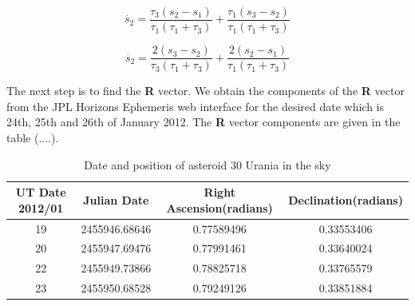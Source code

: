 \documentclass[letterpaper,12pt]{article}
\begin{document}
\begin{equation}
\dot{s_{2}}=\frac{\tau_{3}(s_{2}-s_{1})}{\tau_{1}(\tau_{1}+\tau_{3})}+\frac{\tau_{1}(s_{3}-s_{2})}{\tau_{1}(\tau_{1}+\tau_{3})}
\end{equation}


\begin{equation}
\ddot{s_{2}}=\frac{2(s_{3}-s_{2})}{\tau_{3}(\tau_{1}+\tau_{3})}+\frac{2(s_{2}-s_{1})}{\tau_{1}(\tau_{1}+\tau_{3})}
\end{equation}

The next step is to find the {\bf R} vector. We obtain the components of the {\bf R} vector from the JPL Horizons Ephemeris web interface for the desired date which is 24th, 25th and 26th of January 2012.
The {\bf R} vector components are given in the table (....).

\FloatBarrier
\begin{table}[h!]
\caption{Date and position of asteroid 30 Urania in the sky} %
\centering %
\begin{tabular}{| c | c | c | c |} %
\hline\hline %
UT Date 2012/01 & Julian Date & Right Ascension(radians) & Declination(radians) \\ [0.5ex] %
\hline %
19   &   2455946.68646  & 0.77589496  &  0.33553406  \\ \hline
20   &   2455947.69476  & 0.77991461  &  0.33640024  \\ \hline
22   &   2455949.73866 &  0.78825718 &   0.33765579  \\  \hline
23   &   2455950.68528  & 0.79249126 &   0.33851884  \\ [1ex] %
\hline %
\end{tabular}
\label{table:nonlin} %
\end{table}
\FloatBarrier
\end{document}
